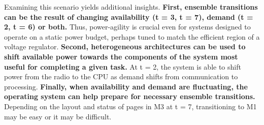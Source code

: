 Examining this scenario yields additional insights. \textbf{First, ensemble
transitions can be the result of changing availability (t = 3, t = 7), demand
(t = 2, t = 6) or both.} Thus, power-agility is crucial even for systems
designed to operate on a static power budget, perhaps tuned to match the
efficient region of a voltage regulator. \textbf{Second, heterogeneous
architectures can be used to shift available power towards the components of
the system most useful for completing a given task.} At t = 2, the system is
able to shift power from the radio to the CPU as demand shifts from
communication to processing. \textbf{Finally, when availability and demand
are fluctuating, the operating system can help prepare for necessary ensemble
transitions.} Depending on the layout and status of pages in M3 at t = 7,
transitioning to M1 may be easy or it may be difficult.
